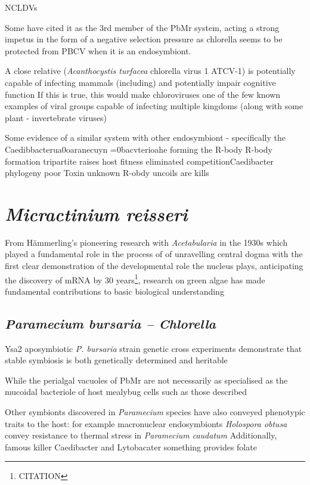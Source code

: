 NCLDVs 

Some have cited it as the 3rd member of the PbMr system, acting a strong impetus in the form of a negative
selection pressure as chlorella seems to be protected from PBCV when it is an endosymbiont.


A close relative (\textit{Acanthocystis turfacea} chlorella virus 1 ATCV-1) is potentially capable of 
infecting mammals (including) and potentially impair cognitive function
If this is true, this would make chloroviruses one of the few known examples of viral groups capable of infecting 
multiple kingdoms (along with some plant - invertebrate viruses) \citep{Yolken2014}


Some evidence of a similar system with other endosymbiont - specifically the Caedibbacterua0oaranecuyn =0bacvterioahe
forming the R-body
R-body formation tripartite raises host fitness eliminated competitionCaedibacter phylogeny poor Toxin unknown
R-obdy uncoils are kills  \citep{Schrallhammer2009}




\section{\textit{Micractinium reisseri}}
From H\"ammerling's pioneering research with \textit{Acetabularia} in the 1930s 
which played a fundamental role in the process of 
of unravelling central dogma with the first clear demonstration of the 
developmental role the nucleus plays, anticipating the discovery of mRNA by 30 years\footnote{CITATION}, research on green algae has made fundamental contributions
to basic biological understanding

\subsection{\textit{Paramecium bursaria – Chlorella}}

Ysa2 aposymbiotic \textit{P. bursaria} strain genetic cross experiments demonstrate that stable symbiosis
is both genetically determined and heritable \citep{Tonooka2007}




While the perialgal vacuoles of PbMr are not necessarily as specialised as the 
mucoidal bacteriole of host mealybug cells such as those described \citep{vonDohlen2001}


Other symbionts discovered in \textit{Paramecium} species have also conveyed phenotypic traits to the host:
for example macronuclear endosymbionts \textit{Holospora obtusa} convey resistance to thermal stress in \textit{Paramecium caudatum} 
\citep{Fujishima2005}
Additionally, famous killer Caedibacter and Lytobacater something provides folate


